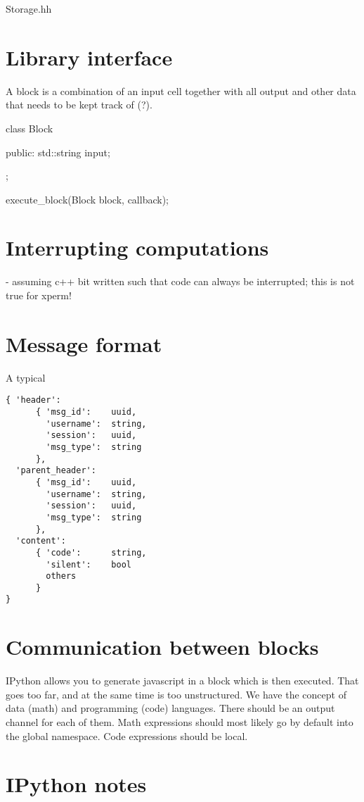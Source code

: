 

Storage.hh



\section{Library interface}

A block is a combination of an input cell together with all output and
other data that needs to be kept track of (?). 

class Block {
   public: 
      std::string input;
      
};

execute_block(Block block, callback);

\section{Interrupting computations}

- assuming c++ bit written such that code can always be interrupted;
  this is not true for xperm! 


\section{Message format}

A typical
\begin{verbatim}
{ 'header':  
      { 'msg_id':    uuid,
        'username':  string,
        'session':   uuid,
        'msg_type':  string
      },
  'parent_header':
      { 'msg_id':    uuid,
        'username':  string,
        'session':   uuid,
        'msg_type':  string
      },
  'content': 
      { 'code':      string,
        'silent':    bool
        others
      }
}
\end{verbatim}

\section{Communication between blocks}

IPython allows you to generate javascript in a block which is then
executed. That goes too far, and at the same time is too unstructured.
We have the concept of data (math) and programming (code)
languages. There should be an output channel for each of them. Math
expressions should most likely go by default into the global
namespace. Code expressions should be local. 


\section{IPython notes}

